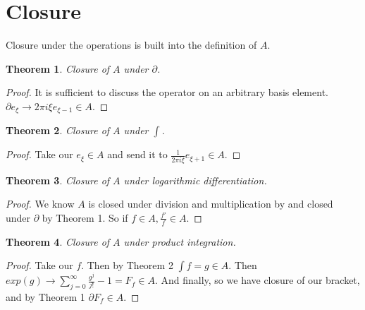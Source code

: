 \documentclass[10pt, oneside]{article}
\newtheorem{thm}{Theorem}
\begin{document}
\section{Closure}
   Closure under the operations is built into the definition of $A$.
   \begin{thm}
      Closure of $A$ under $\partial$.
   \end{thm}
   \begin{proof}
      It is sufficient to discuss the operator on an arbitrary basis element. $\partial e_\xi \to 2 \pi i \xi e_{\xi-1} \in A$.
   \end{proof}
   \begin{thm}
      Closure of $A$ under $\int$. 
   \end{thm}
   \begin{proof}
      Take our $e_\xi \in A$ and send it to $\frac{1}{2 \pi i \xi} e_{\xi + 1} \in A$.
   \end{proof}
   \begin{thm}
      Closure of $A$ under logarithmic differentiation.
   \end{thm}
   \begin{proof}
      We know $A$ is closed under division and multiplication by \cite{Hormander1958} and closed under $\partial$ by Theorem 1. So if $f \in A, \frac{f'}{f} \in A$.
   \end{proof}
   \begin{thm}
      Closure of $A$ under product integration.
   \end{thm}
   \begin{proof}
      Take our $f$. Then by Theorem 2 $\int f = g \in A$. Then $exp(g) \to \sum_{j=0}^{\infty} \frac{g^j}{j!} - 1 = F_f \in A$. And finally, so we have closure of our bracket, and by Theorem 1 $\partial F_f \in A$.  
   \end{proof}
\end{document}
